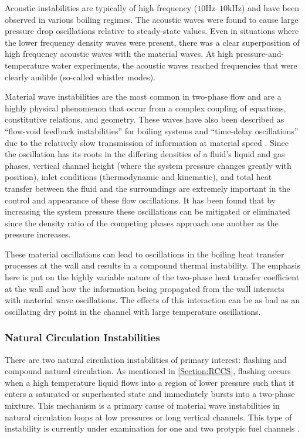 Acoustic instabilities are typically of high frequency ($10$Hz--$10$kHz) and have been observed in various boiling regimes.
The acoustic waves were found to cause large pressure drop oscillations relative to steady-state values.
Even in situations where the lower frequency density waves were present, there was a clear superposition of high frequency acoustic waves with the material waves.
At high pressure-and-temperature water experiments, the acoustic waves reached frequencies that were clearly audible (so-called whistler modes).

Material wave instabilities are the most common in two-phase flow and are a highly physical phenomenon that occur from a complex coupling of \THs equations, constitutive relations, and geometry.
These waves have also been described as ``flow-void feedback instabilities'' for boiling systems \cite{neal_mechanisms_1967-1} and ``time-delay oscillations'' due to the relatively slow transmission of information at material speed \cite{boure_oscillatory_1966-1}.
Since the oscillation has its roots in the differing densities of a fluid's liquid and gas phases, vertical channel height (where the system pressure changes greatly with position), inlet conditions (thermodynamic and kinematic), and total heat transfer between the fluid and the surroundings are extremely important in the control and appearance of these flow oscillations.
It has been found that by increasing the system pressure these oscillations can be mitigated or eliminated since the density ratio of the competing phases approach one another as the pressure increases.

These material oscillations can lead to oscillations in the boiling heat transfer processes at the wall and results in a compound thermal instability.
The emphasis here is put on the highly variable nature of the two-phase heat transfer coefficient at the wall and how the information being propagated from the wall interacts with material wave oscillations.
The effects of this interaction can be as bad as an oscillating dry point in the channel with large temperature oscillations.



\subsubsection{Natural Circulation Instabilities}
There are two natural circulation instabilities of primary interest: flashing and compound natural circulation.
As mentioned in \cref{Section:RCCS}, flashing occurs when a high temperature liquid flows into a region of lower pressure such that it enters a saturated or superheated state and immediately bursts into a two-phase mixture.
This mechanism is a primary cause of material wave instabilities in natural circulation loops at low pressures or long vertical channels.
This type of instability is currently under examination for one and two protypic fuel channels \cite{marcel_experimental_2009-1,marcel_experimental_2010-1}.

